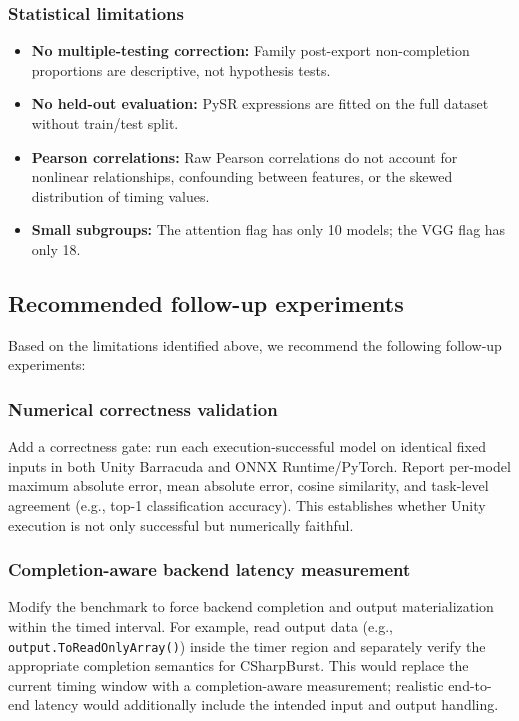 \documentclass[10pt,twocolumn]{article}
\begin{document}
\subsubsection{Statistical limitations}

\begin{itemize}[nosep,leftmargin=*]
  \item \textbf{No multiple-testing correction:} Family post-export non-completion proportions are descriptive, not hypothesis tests.
  \item \textbf{No held-out evaluation:} PySR expressions are fitted on the full dataset without train/test split.
  \item \textbf{Pearson correlations:} Raw Pearson correlations do not account for nonlinear relationships, confounding between features, or the skewed distribution of timing values.
  \item \textbf{Small subgroups:} The attention flag has only 10 models; the VGG flag has only 18.
\end{itemize}

\subsection{Recommended follow-up experiments}\label{sec:followup}

Based on the limitations identified above, we recommend the following follow-up experiments:

\subsubsection{Numerical correctness validation}

Add a correctness gate: run each execution-successful model on identical fixed inputs in both Unity Barracuda and ONNX Runtime/PyTorch. Report per-model maximum absolute error, mean absolute error, cosine similarity, and task-level agreement (e.g., top-1 classification accuracy). This establishes whether Unity execution is not only successful but numerically faithful.

\subsubsection{Completion-aware backend latency measurement}

Modify the benchmark to force backend completion and output materialization within the timed interval. For example, read output data (e.g., \texttt{output.ToReadOnlyArray()}) inside the timer region and separately verify the appropriate completion semantics for CSharpBurst. This would replace the current timing window with a completion-aware measurement; realistic end-to-end latency would additionally include the intended input and output handling.
\end{document}
